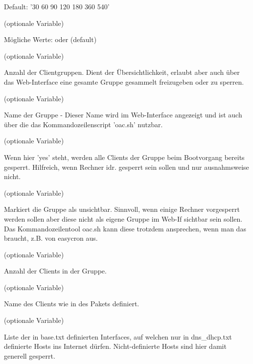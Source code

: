 \begin{description}
    Default: '30 60 90 120 180 360 540'
    
 (optionale Variable)

    Mögliche Werte:  oder  (default)

 (optionale Variable)

    Anzahl der Clientgruppen. Dient der Übersichtlichkeit, erlaubt aber
    auch über das Web-Interface eine gesamte Gruppe gesammelt freizugeben
    oder zu sperren.

 (optionale Variable)

    Name der Gruppe - Dieser Name wird im Web-Interface angezeigt und ist auch
    über die das Kommandozeilenscript 'oac.sh' nutzbar.

 (optionale Variable)

    Wenn hier 'yes' steht, werden alle Clients der Gruppe beim Bootvorgang bereits
    gesperrt. Hilfreich, wenn Rechner idr. gesperrt sein sollen und nur ausnahmsweise nicht.

 (optionale Variable)

    Markiert die Gruppe als unsichtbar. Sinnvoll, wenn einige Rechner vorgesperrt werden sollen
    aber diese nicht als eigene Gruppe im Web-If sichtbar sein sollen.
    Das Kommandozeilentool oac.sh kann diese trotzdem ansprechen, wenn man das braucht, z.B. von
    easycron aus.

 (optionale Variable)

    Anzahl der Clients in der Gruppe.

 (optionale Variable)

    Name des Clients wie in {} des Pakets  definiert.

 (optionale Variable)

    Liste der in base.txt definierten Interfaces, auf welchen nur in dns\_dhcp.txt definierte Hosts
    ins Internet dürfen. Nicht-definierte Hosts sind hier damit generell gesperrt.

\end{description}

